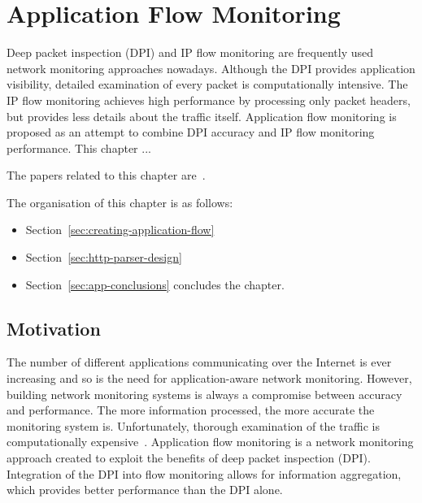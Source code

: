 \chapter{Application Flow Monitoring}

\begin{chapintro}

Deep packet inspection (DPI) and IP flow monitoring are frequently used network monitoring approaches nowadays. Although the DPI provides application visibility, detailed examination of every packet is computationally intensive. The IP flow monitoring achieves high performance by processing only packet headers, but provides less details about the traffic itself. Application flow monitoring is proposed as an attempt to combine DPI accuracy and IP flow monitoring performance. This chapter ... 

The papers related to this chapter are~\cite{Velan-2014-Next, Velan-2013-Design}.

The organisation of this chapter is as follows:
\begin{itemize}
  \item Section~\ref{sec:creating-application-flow} 
  \item Section~\ref{sec:http-parser-design}
  \item Section~\ref{sec:app-conclusions} concludes the chapter.
\end{itemize}

\end{chapintro}

\newpage


\section{Motivation}
The number of different applications communicating over the Internet is ever increasing and so is the need for application-aware network monitoring. However, building network monitoring systems is always a compromise between accuracy and performance. The more information processed, the more accurate the monitoring system is. Unfortunately, thorough examination of the traffic is computationally expensive~\cite{Gao-2006-Efficient, Lai-2004-Parallel}. Application flow monitoring is a network monitoring approach created to exploit the benefits of deep packet inspection (DPI). Integration of the DPI into flow monitoring allows for information aggregation, which provides better performance than the DPI alone.

